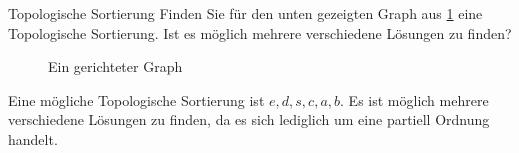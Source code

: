 \documentclass{article}
\begin{document}
\begin{exercise}{Topologische Sortierung}
  Finden Sie für den unten gezeigten Graph aus \ref{fig:topo} eine Topologische Sortierung. Ist es möglich mehrere verschiedene Lösungen zu finden?
  \begin{figure}[ht]
    \centering

    \caption{Ein gerichteter Graph}\label{fig:topo}
  \end{figure}

  \begin{solution}
    Eine mögliche Topologische Sortierung ist $e, d, s, c, a, b$. Es ist möglich mehrere verschiedene Lösungen zu finden, da es sich lediglich um eine partiell Ordnung handelt.
  \end{solution}
\end{exercise}
\end{document}
